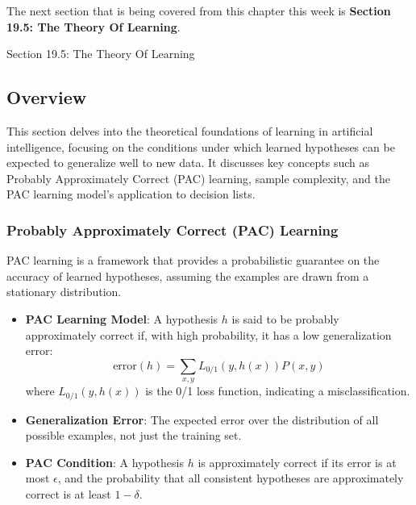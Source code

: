 The next section that is being covered from this chapter this week is \textbf{Section 19.5: The Theory Of Learning}.

\begin{notes}{Section 19.5: The Theory Of Learning}
    \subsection*{Overview}

    This section delves into the theoretical foundations of learning in artificial intelligence, focusing on the conditions under which learned hypotheses can be expected to generalize well to new data. 
    It discusses key concepts such as Probably Approximately Correct (PAC) learning, sample complexity, and the PAC learning model's application to decision lists.
    
    \subsubsection*{Probably Approximately Correct (PAC) Learning}
    
    PAC learning is a framework that provides a probabilistic guarantee on the accuracy of learned hypotheses, assuming the examples are drawn from a stationary distribution.
    
    \begin{highlight}
    
        \begin{itemize}
            \item \textbf{PAC Learning Model}: A hypothesis $h$ is said to be probably approximately correct if, with high probability, it has a low generalization error:
            \[
            \text{error}(h) = \sum_{x,y} L_{0/1}(y, h(x)) P(x,y)
            \]
            where $L_{0/1}(y, h(x))$ is the 0/1 loss function, indicating a misclassification.
            \item \textbf{Generalization Error}: The expected error over the distribution of all possible examples, not just the training set.
            \item \textbf{PAC Condition}: A hypothesis $h$ is approximately correct if its error is at most $\epsilon$, and the probability that all consistent hypotheses are approximately correct is at least $1 - \delta$.
        \end{itemize}
    
    \end{highlight}
    

\end{notes}
